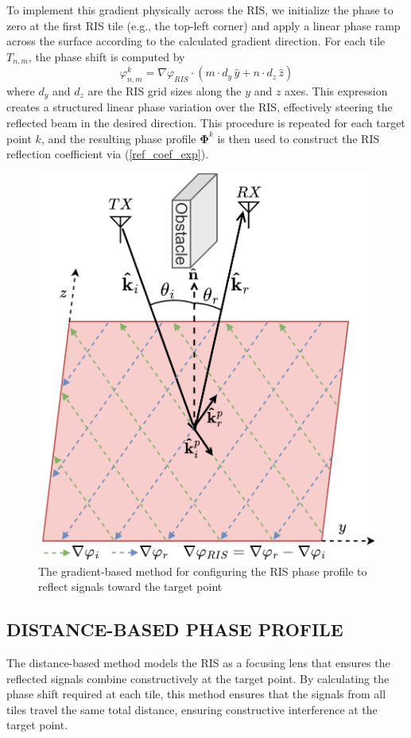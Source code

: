 \documentclass{IEEEoj}
\begin{document}
To implement this gradient physically across the RIS, we initialize the phase to zero at the first RIS tile (e.g., the top-left corner) and apply a linear phase ramp across the surface according to the calculated gradient direction. For each tile $T_{n,m}$, the phase shift is computed by
\begin{equation}
	\varphi_{n,m}^k = \nabla \varphi_{RIS} \cdot (m \cdot d_y \, \hat{y} + n \cdot d_z \, \hat{z})
\end{equation}
where $d_y$ and $d_z$ are the RIS grid sizes along the $y$ and $z$ axes. This expression creates a structured linear phase variation over the RIS, effectively steering the reflected beam in the desired direction. This procedure is repeated for each target point $k$, and the resulting phase profile $\mathbf{\Phi}^k$ is then used to construct the RIS reflection coefficient via (\ref{ref_coef_exp}).
 
\begin{figure}
	\centering \includegraphics[width=.8\linewidth]{RIS_Phase_Gradient.png}
	\caption{The gradient-based method for configuring the RIS phase profile to reflect signals toward the target point}
	\label{RIS_Phase_Gradient}
\end{figure}

\subsection{DISTANCE-BASED PHASE PROFILE}
The distance-based method models the RIS as a focusing lens that ensures the reflected signals combine constructively at the target point. By calculating the phase shift required at each tile, this method ensures that the signals from all tiles travel the same total distance, ensuring constructive interference at the target point.
\end{document}
